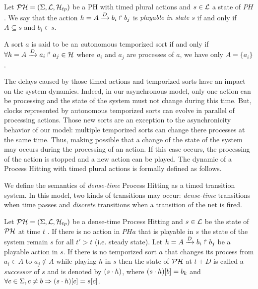 \begin{definition} 
\label{def:playableAction}
Let $\mathcal{PH} = (\Sigma,\mathcal{L},\mathcal{H}_{tp})$ be a PH with timed plural actions and $s \in \mathcal{L}$ a state of $PH$.
We say that the action $h = A\xrightarrow{D} b_i \Rsh b_j$
is \emph{playable in state $s$} if and only if
$A \subseteq s$ and $b_i \in s$. %
\end{definition}

\begin{definition}
\label{def:TempSort}
A sort $a$ is said to be an {\emph autonomous temporized sort} if and only if $\forall h = A\xrightarrow{D} a_i \Rsh a_j \in \mathcal{H}$  where $a_i$ and $a_j$ are processes of $a$, we have only $A = \{a_i\}$.
\end{definition}

The delays caused by those timed actions and temporized sorts have an impact on the system dynamics.
Indeed, in our asynchronous model, only one action can be processing and the state of the system must not change during this time.
But, clocks represented by autonomous temporized sorts can evolve in parallel of processing actions.
Those new sorts are an exception to the asynchronicity behavior of our model: multiple temporized sorts can change there processes at the same time.
Thus, making possible that a change of the state of the system may occurs during the processing of an action.
If this case occurs, the processing of the action is stopped and a new action can be played.
The dynamic of a Process Hitting with timed plural actions is formally defined as follows.

We define the semantics of \emph{dense-time} Process Hitting as a timed transition system.
In this model, two kinds of transitions may occur: \emph{dense-time} transitions when time passes and \emph{discrete} transitions when a transition of the net is fired.


\begin{definition}
\label{def:semantic}
Let $\mathcal{PH} = (\Sigma,\mathcal{L},\mathcal{H}_{tp})$ be a dense-time Process Hitting and $s \in \mathcal{L}$ be the state of $\mathcal{PH}$ at time $t$ .
If there is no action in $PHa$ that is playable in $s$ the state of the system remain $s$ for all $t' > t$ (i.e. steady state).
Let $h = A\xrightarrow{D} b_i \Rsh b_j$ be a playable action in $s$.
If there is no temporized sort $a$ that changes its process from $a_i \in A$ to $a_j \not \in A$ while playing $h$ in $s$ then the state of $\mathcal{PH}$ at $t+D$
is called a \emph{successor} of $s$ and
is denoted by $(s \cdot h)$,
where ${(s \cdot h)[b]} = b_k$ and
$\forall c \in \Sigma, c \neq b \Rightarrow {(s \cdot h)[c]}={s[c]}$.
\end{definition}

